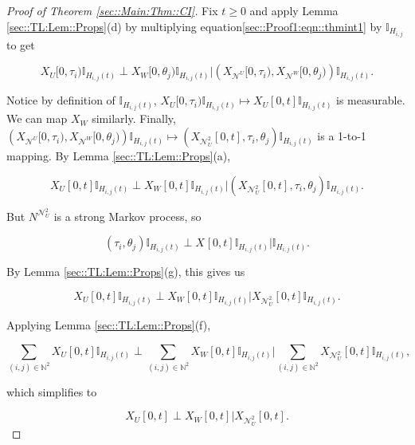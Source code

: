 \documentclass[12pt]{article}
\newcommand{\mb}{\mathbb}
\newcommand{\mc}{\mathcal}
\newcommand{\ind}{\hspace{24pt}}
\renewcommand{\U}{U}							%
\newcommand{\UU}{W}								%
\renewcommand{\t}{t}							%
\newcommand{\X}{X}								%
\newcommand{\neigh}{\mc{N}}						%
\newcommand{\dneigh}{\mc{N}^2}					%
\newcommand{\vind}[1]{^{#1}}					%
\newcommand{\cind}[1]{_{#1}}					%
\newcommand{\tip}[1]{#1}						%
\newcommand{\poiss}{N}							%
\newcommand{\indx}[1]{_{#1}}					%
\newcommand{\dnvind}[1]{_{#1}}					%
\newcommand{\rt}{\tau}							%
\newcommand{\rtt}{\theta}						%
\newcommand{\pathseted}[2]{H_{#1,#2}}			%
\begin{document}
\begin{proof}[Proof of Theorem \ref{sec::Main:Thm::CI}]
\ind Fix \(\t \geq 0\) and apply Lemma \ref{sec::TL:Lem::Props}(d) by multiplying equation\eqref{sec::Proof1:eqn::thmint1} by \(\mb{I}_{\pathseted{i}{j}}\) to get

\[\X\cind{\U}\tip{[0,\rt\indx{i})}\mb{I}_{\pathseted{i}{j}(\t)}\perp\X\cind{\UU}\tip{[0,\rtt\indx{j})}\mb{I}_{\pathseted{i}{j}(\t)}\big|\left(\X\cind{\neigh\vind{\U}}\tip{[0,\rt\indx{i})},\X\cind{\neigh\vind{\UU}}\tip{[0,\rtt\indx{j})}\right)\mb{I}_{\pathseted{i}{j}(\t)}.\]


Notice by definition of \(\mb{I}_{\pathseted{i}{j}(\t)}\), \(\X\cind{\U}\tip{[0,\rt\indx{i})}\mb{I}_{\pathseted{i}{j}(\t)} \mapsto \X\cind{\U}\tip{[0,\t]}\mb{I}_{\pathseted{i}{j}(\t)}\) is measurable. We can map \(\X\cind{\UU}\tip{}\) similarly. Finally, \(\left(\X\cind{\neigh\vind{\U}}\tip{[0,\rt\indx{i})},\X\cind{\neigh\vind{\UU}}\tip{[0,\rtt\indx{j})}\right)\mb{I}_{\pathseted{i}{j}(\t)}\mapsto (\X\cind{\dneigh\dnvind{\U}}\tip{[0,\t]}, \rt\indx{i},\rtt\indx{j})\mb{I}_{\pathseted{i}{j}(\t)}\) is a 1-to-1 mapping. By Lemma \ref{sec::TL:Lem::Props}(a),

\[\X\cind{\U}\tip{[0,\t]}\mb{I}_{\pathseted{i}{j}(\t)}\perp\X\cind{\UU}\tip{[0,\t]}\mb{I}_{\pathseted{i}{j}(\t)}\big|\left(\X\cind{\dneigh\dnvind{\U}}\tip{[0,\t]},\rt\indx{i},\rtt\indx{j}\right)\mb{I}_{\pathseted{i}{j}(\t)}.\]

But \(\poiss\vind{\dneigh\dnvind{\U}}\) is a strong Markov process, so 

\[(\rt\indx{i},\rtt\indx{j})\mb{I}_{\pathseted{i}{j}(\t)}\perp \X\cind{}\tip{[0,\t]}\mb{I}_{\pathseted{i}{j}(\t)}|\mb{I}_{\pathseted{i}{j}(\t)}.\]

By Lemma \ref{sec::TL:Lem::Props}(g), this gives us

\[\X\cind{\U}\tip{[0,\t]}\mb{I}_{\pathseted{i}{j}(\t)}\perp\X\cind{\UU}\tip{[0,\t]}\mb{I}_{\pathseted{i}{j}(\t)}\big|\X\cind{\dneigh\dnvind{\U}}\tip{[0,\t]}\mb{I}_{\pathseted{i}{j}(\t)}.\]

Applying Lemma \ref{sec::TL:Lem::Props}(f),

\[\sum_{(i,j)\in\mb{N}^2}\X\cind{\U}\tip{[0,\t]}\mb{I}_{\pathseted{i}{j}(\t)}\perp\sum_{(i,j)\in\mb{N}^2}\X\cind{\UU}\tip{[0,\t]}\mb{I}_{\pathseted{i}{j}(\t)}\bigg|\sum_{(i,j)\in\mb{N}^2}\X\cind{\dneigh\dnvind{\U}}\tip{[0,\t]}\mb{I}_{\pathseted{i}{j}(\t)},\]

which simplifies to 

\[\X\cind{\U}\tip{[0,\t]}\perp\X\cind{\UU}\tip{[0,\t]}\big|\X\cind{\dneigh\dnvind{\U}}\tip{[0,\t]}.\]


\end{proof}
\end{document}
